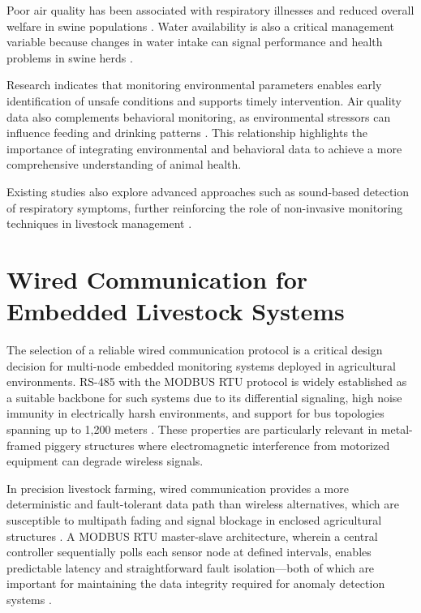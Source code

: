 Poor air quality has been associated with respiratory illnesses and reduced overall welfare in swine populations \cite{livestockproduction2026, yamsakul2025machine}. Water availability is also a critical management variable because changes in water intake can signal performance and health problems in swine herds \cite{whitney2018water, samuel2025water}.

Research indicates that monitoring environmental parameters enables early identification of unsafe conditions and supports timely intervention. Air quality data also complements behavioral monitoring, as environmental stressors can influence feeding and drinking patterns \cite{sadeghi2023improving, yamsakul2025machine}. This relationship highlights the importance of integrating environmental and behavioral data to achieve a more comprehensive understanding of animal health.

Existing studies also explore advanced approaches such as sound-based detection of respiratory symptoms, further reinforcing the role of non-invasive monitoring techniques in livestock management \cite{yamsakul2025machine}.


\section{Wired Communication for Embedded Livestock Systems}

The selection of a reliable wired communication protocol is a critical design decision for multi-node embedded monitoring systems deployed in agricultural environments. RS-485 with the MODBUS RTU protocol is widely established as a suitable backbone for such systems due to its differential signaling, high noise immunity in electrically harsh environments, and support for bus topologies spanning up to 1,200 meters \cite{adeoye2025animalia, arguta2024iop}. These properties are particularly relevant in metal-framed piggery structures where electromagnetic interference from motorized equipment can degrade wireless signals.

In precision livestock farming, wired communication provides a more deterministic and fault-tolerant data path than wireless alternatives, which are susceptible to multipath fading and signal blockage in enclosed agricultural structures \cite{carvalho2023iot, adeoye2025animalia}. A MODBUS RTU master-slave architecture, wherein a central controller sequentially polls each sensor node at defined intervals, enables predictable latency and straightforward fault isolation---both of which are important for maintaining the data integrity required for anomaly detection systems \cite{arguta2024iop, carvalho2023iot}.


